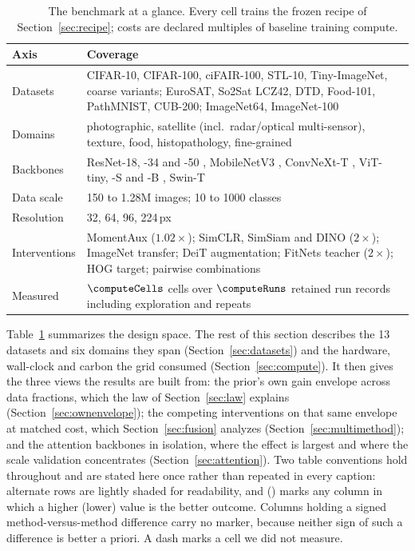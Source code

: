 \begin{table}[pos=htbp]
\caption{The benchmark at a glance. Every cell trains the frozen recipe
of Section~\ref{sec:recipe}; costs are declared multiples of baseline
training compute.}
\label{tab:glance}
\centering\scriptsize
\setlength{\tabcolsep}{2.6pt}
\begin{tabular}{lp{}}
\toprule
\textbf{Axis} & \textbf{Coverage} \\
\midrule
Datasets & CIFAR-10, CIFAR-100, ciFAIR-100, STL-10, Tiny-ImageNet, coarse
  variants; EuroSAT, So2Sat LCZ42, DTD, Food-101, PathMNIST, CUB-200;
  ImageNet64, ImageNet-100 \\
Domains & photographic, satellite (incl.\ radar/optical multi-sensor),
  texture, food, histopathology, fine-grained \\
Backbones & ResNet-18, -34 and -50 \citep{he2016resnet}, MobileNetV3
  \citep{howard2019mobilenetv3}, ConvNeXt-T \citep{liu2022convnext},
  ViT-tiny, -S and -B \citep{dosovitskiy2021vit}, Swin-T
  \citep{liu2021swin} \\
Data scale & 150 to 1.28M images; 10 to 1000 classes \\
Resolution & 32, 64, 96, 224\,px \\
Interventions & MomentAux ($1.02\times$); SimCLR, SimSiam and DINO
  ($2\times$); ImageNet transfer; DeiT augmentation; FitNets teacher
  ($2\times$); HOG target; pairwise combinations \\
Measured & $\computeCells$ cells over $\computeRuns$ retained run records
  including exploration and repeats \\
\bottomrule
\end{tabular}
\end{table}

Table~\ref{tab:glance} summarizes the design space. The rest of this section describes the 13 datasets and six domains they span
(Section~\ref{sec:datasets}) and the hardware, wall-clock and carbon the grid
consumed (Section~\ref{sec:compute}). It then gives the three views the results
are built from: the prior's own gain envelope across data fractions, which the
law of Section~\ref{sec:law} explains (Section~\ref{sec:ownenvelope}); the
competing interventions on that same envelope at matched cost, which
Section~\ref{sec:fusion} analyzes (Section~\ref{sec:multimethod}); and the
attention backbones in isolation, where the effect is largest and where the
scale validation concentrates (Section~\ref{sec:attention}).
Two table conventions hold throughout and are stated here once rather than
repeated in every caption: alternate rows are lightly shaded for
readability, and \up{} (\down{}) marks any column in which a higher
(lower) value is the better outcome. Columns holding a signed
method-versus-method difference carry no marker, because neither sign of
such a difference is better a priori. A dash marks a cell we did not
measure.

